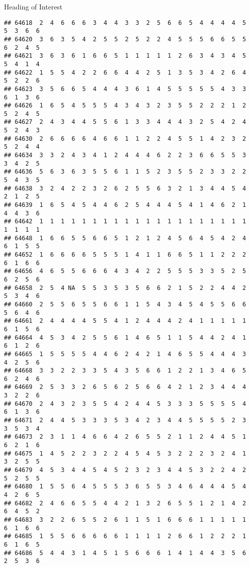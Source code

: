 \documentclass[
  ignorenonframetext,
]{beamer}
\begin{document}
\begin{frame}[fragile]{Heading of Interest}
\begin{verbatim}
## 64618  2  4  6  6  6  3  4  4  3  3  2  5  6  6  5  4  4  4  4  5  5  3  6  6
## 64620  3  6  3  5  4  2  5  5  2  5  2  2  4  5  5  5  6  6  5  5  6  2  4  5
## 64621  3  6  3  6  1  6  6  5  1  1  1  1  1  2  6  3  4  3  4  5  5  4  1  4
## 64622  1  5  5  4  2  2  6  6  4  4  2  5  1  3  5  3  4  2  6  4  5  2  2  6
## 64623  3  5  6  6  5  4  4  4  3  6  1  4  5  5  5  5  5  4  3  3  6  1  3  6
## 64626  1  6  5  4  5  5  5  4  3  4  3  2  3  5  5  2  2  2  1  2  5  2  4  5
## 64627  2  4  3  4  4  5  5  6  1  3  3  4  4  4  3  2  5  4  2  4  5  2  4  3
## 64630  2  6  6  6  6  4  6  6  1  1  2  2  4  5  5  1  4  2  3  2  5  2  4  4
## 64634  3  3  2  4  3  4  1  2  4  4  4  6  2  2  3  6  6  5  5  3  3  4  2  5
## 64636  5  6  3  6  3  5  5  6  1  1  5  2  3  5  5  2  3  3  2  2  5  4  3  5
## 64638  3  2  4  2  2  3  2  6  2  5  5  6  3  2  1  3  4  4  5  4  2  1  2  5
## 64639  1  6  5  4  5  4  4  6  2  5  4  4  4  5  4  1  4  6  2  1  4  4  3  6
## 64642  1  1  1  1  1  1  1  1  1  1  1  1  1  1  1  1  1  1  1  1  1  1  1  1
## 64648  1  6  6  5  5  6  6  5  1  2  1  2  4  5  6  4  5  4  2  4  6  1  5  5
## 64652  1  6  6  6  6  5  5  5  1  4  1  1  6  6  5  1  1  2  2  2  6  1  6  6
## 64656  4  6  5  5  6  6  6  4  3  4  2  2  5  5  5  3  3  5  2  5  6  2  5  6
## 64658  2  5  4 NA  5  5  3  5  3  5  6  6  2  1  5  2  2  4  4  2  5  3  4  6
## 64660  2  5  5  6  5  5  6  6  1  1  5  4  3  4  5  4  5  5  6  6  5  6  4  6
## 64661  2  4  4  4  4  5  5  4  1  2  4  4  4  2  4  1  1  1  1  1  6  1  5  6
## 64664  4  5  3  4  2  5  5  6  1  4  6  5  1  1  5  4  4  2  4  1  6  1  2  6
## 64665  1  5  5  5  5  4  4  6  2  4  2  1  4  6  5  5  4  4  4  3  4  2  5  6
## 64668  3  3  2  2  3  3  5  4  3  5  6  6  1  2  2  1  3  4  6  5  6  2  4  6
## 64669  2  5  3  3  2  6  5  6  2  5  6  6  4  2  1  2  3  4  4  4  3  2  2  6
## 64670  2  4  3  2  3  5  5  4  2  4  4  5  3  3  3  5  5  5  5  4  6  1  3  6
## 64671  2  4  4  5  3  3  3  5  3  4  2  3  4  4  5  5  5  5  2  3  3  5  3  4
## 64673  2  3  1  1  4  6  6  4  2  6  5  5  2  1  1  2  4  4  5  1  6  2  1  6
## 64675  1  4  5  2  2  3  2  2  4  5  4  5  3  2  2  2  3  2  4  1  3  2  5  5
## 64679  4  5  3  4  4  5  4  5  2  3  2  3  4  4  5  3  2  2  4  2  5  2  5  5
## 64680  1  5  5  6  4  5  5  5  3  6  5  5  3  4  6  4  4  4  5  4  4  2  6  5
## 64682  2  4  6  6  5  5  4  4  2  1  3  2  6  5  5  1  2  1  4  2  6  4  5  2
## 64683  3  2  2  6  5  5  2  6  1  1  5  1  6  6  6  1  1  1  1  1  6  1  6  6
## 64685  1  5  5  6  6  6  6  6  1  1  1  1  2  6  6  1  2  2  2  1  6  1  6  5
## 64686  5  4  4  3  1  4  5  1  5  6  6  6  1  4  1  4  4  3  5  6  2  5  3  6

\end{verbatim}
\end{frame}
\end{document}
